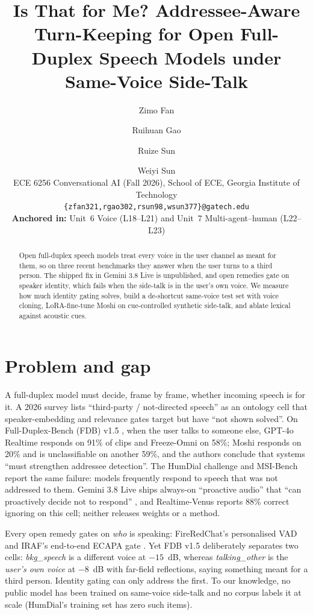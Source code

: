 \documentclass[11pt]{article}
\title{Is That for Me? Addressee-Aware Turn-Keeping for Open Full-Duplex Speech Models under Same-Voice Side-Talk}
\author{Zimo Fan \and Ruihuan Gao \and Ruize Sun \and Weiyi Sun \\
  ECE 6256 Conversational AI (Fall 2026), School of ECE, Georgia Institute of Technology \\
  \texttt{\{zfan321,rgao302,rsun98,wsun377\}@gatech.edu} \\
  \textbf{Anchored in:} Unit~6 Voice (L18--L21) and Unit~7 Multi-agent--human (L22--L23)}
\begin{document}
\maketitle

\begin{abstract}
Open full-duplex speech models treat every voice in the user channel as meant for them, so on three recent benchmarks they answer when the user turns to a third person. The shipped fix in Gemini 3.8 Live is unpublished, and open remedies gate on speaker identity, which fails when the side-talk is in the user's own voice. We measure how much identity gating solves, build a de-shortcut same-voice test set with voice cloning, LoRA-fine-tune Moshi on cue-controlled synthetic side-talk, and ablate lexical against acoustic cues.
\end{abstract}

\section{Problem and gap}
A full-duplex model must decide, frame by frame, whether incoming speech is for it. A 2026 survey \citep{lu2026survey} lists ``third-party / not-directed speech'' as an ontology cell that speaker-embedding and relevance gates target but have ``not shown solved''. On Full-Duplex-Bench (FDB) v1.5 \citep{lin2025fdb15}, when the user talks to someone else, GPT-4o Realtime \citep{openai2024gpt4o} responds on 91\% of clips and Freeze-Omni \citep{wang2024freezeomni} on 58\%; Moshi responds on 20\% and is unclassifiable on another 59\%, and the authors conclude that systems ``must strengthen addressee detection''. The HumDial challenge \citep{wang2026humdial} and MSI-Bench \citep{xiong2026msibench} report the same failure: models frequently respond to speech that was not addressed to them. Gemini 3.8 Live ships always-on ``proactive audio'' that ``can proactively decide not to respond'' \citep{google2026gemini38live}, and Realtime-Venus \citep{antgroup2026venus} reports 88\% correct ignoring on this cell; neither releases weights or a method.

Every open remedy gates on \emph{who} is speaking: FireRedChat's personalised VAD \citep{chen2025fireredchat,ding2019pvad} and IRAF's end-to-end ECAPA gate \citep{zhong2026iraf}. Yet FDB v1.5 deliberately separates two cells: \emph{bkg\_speech} is a different voice at $-15$~dB, whereas \emph{talking\_other} is the \emph{user's own voice} at $-8$~dB with far-field reflections, saying something meant for a third person. Identity gating can only address the first. To our knowledge, no public model has been trained on same-voice side-talk and no corpus labels it at scale (HumDial's training set has zero such items).
\end{document}
